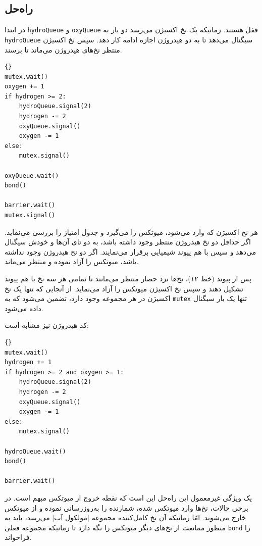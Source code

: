 \documentclass{book}
\begin{document}
\subsection {راه‌حل  }

    در ابتدا {\tt hydroQueue} و {\tt oxyQueue} قفل هستند. زمانیکه یک نخ اکسیژن می‌رسد دو بار به {\tt hydroQueue}  سیگنال می‌دهد تا 
    به دو هیدروژن اجازه ادامه کار دهد. سپس نخ اکسیژن منتظر نخ‌های هیدروژن می‌ماند تا برسند. 

\begin{latin}
\begin{lstlisting}[title=\rl{کد اکسیژن}]{}
mutex.wait()
oxygen += 1
if hydrogen >= 2:
    hydroQueue.signal(2)
    hydrogen -= 2
    oxyQueue.signal()
    oxygen -= 1
else:
    mutex.signal()

oxyQueue.wait()
bond()

barrier.wait()
mutex.signal()
\end{lstlisting}
\end{latin}

    هر نخ اکسیژن که وارد می‌شود، میوتکس را می‌گیرد و جدول امتیاز را بررسی می‌نماید. اگر حداقل دو نخ هیدروژن منتظر وجود داشته باشد، به دو تای آن‌ها و خودش 
    سیگنال می‌دهد و سپس با هم پیوند شیمیایی برقرار می‌نمایند. اگر دو نخ هیدروژن وجود نداشته باشد، میوتکس را آزاد نموده و منتظر می‌ماند. 

    پس از پیوند (خط ۱۲)، نخ‌ها نزد حصار منتظر می‌مانند تا تمامی هر سه نخ با هم پیوند تشکیل دهند و سپس نخ اکسیژن میوتکس را آزاد می‌نماید. 
    از آنجایی که تنها یک نخ اکسیژن در هر مجموعه وجود دارد، تضمین می‌شود که به  {\tt mutex} تنها یک بار سیگنال داده می‌شود. 

    کد هیدروژن نیز مشابه است: 

\begin{latin}
\begin{lstlisting}[title=\rl{کد هیدروژن}]{}
mutex.wait()
hydrogen += 1
if hydrogen >= 2 and oxygen >= 1:
    hydroQueue.signal(2)
    hydrogen -= 2
    oxyQueue.signal()
    oxygen -= 1
else:
    mutex.signal()

hydroQueue.wait()
bond()

barrier.wait()
\end{lstlisting}
\end{latin}

    یک ویژگی غیرمعمول این راه‌حل این است که نقطه خروج از میوتکس مبهم است. در برخی حالات، نخ‌ها وارد میوتکس شده، شمارنده را 
    به‌روزرسانی نموده و از میوتکس خارج می‌شوند. امّا زمانیکه آن نخ کامل‌کننده مجموعه [مولکول آب] می‌رسد، باید به منظور ممانعت از نخ‌های دیگر 
    میوتکس را نگه دارد تا زمانیکه مجموعه فعلی {\tt bond} را فراخواند. 
\end{document}
